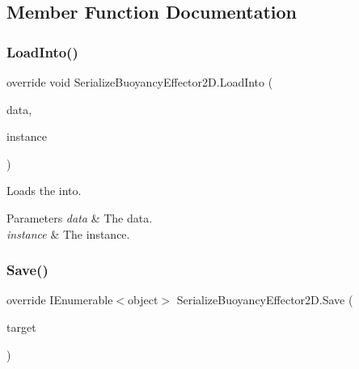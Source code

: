 \subsection{Member Function Documentation}
\mbox{\label{class_serialize_buoyancy_effector2_d_a62d9b2d56f69620c38994d026c8b479f}} 
\subsubsection{\texorpdfstring{Load\+Into()}{LoadInto()}}
{\footnotesize\ttfamily override void Serialize\+Buoyancy\+Effector2\+D.\+Load\+Into (\begin{DoxyParamCaption}\item[{object \mbox{[}$\,$\mbox{]}}]{data,  }\item[{Buoyancy\+Effector2D}]{instance }\end{DoxyParamCaption})\hspace{0.3cm}{\ttfamily [inline]}}



Loads the into. 


\begin{DoxyParams}{Parameters}
{\em data} & The data.\\
\hline
{\em instance} & The instance.\\
\hline
\end{DoxyParams}
\mbox{\label{class_serialize_buoyancy_effector2_d_ae962d6acb99692dc665c8c87b52bd6c1}} 
\subsubsection{\texorpdfstring{Save()}{Save()}}
{\footnotesize\ttfamily override I\+Enumerable$<$object$>$ Serialize\+Buoyancy\+Effector2\+D.\+Save (\begin{DoxyParamCaption}\item[{Buoyancy\+Effector2D}]{target }\end{DoxyParamCaption})\hspace{0.3cm}{\ttfamily [inline]}}



